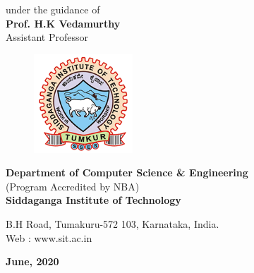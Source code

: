 \begin{titlingpage}
{\normalsize under the guidance of}\\
\Large{\textbf{Prof. H.K Vedamurthy}}\\
Assistant Professor\\
\vfill
\begin{figure}[h]
    \centering
    \includegraphics[height=3.7cm]{images/sit.png}
\end{figure}

\textbf{Department of Computer Science \& Engineering}\\
{\normalsize (Program Accredited by NBA)} \\
\textbf{Siddaganga Institute of Technology}\\

\begin{normalsize}
B.H Road, Tumakuru-572 103, Karnataka, India.\\
Web : www.sit.ac.in \\
\end{normalsize}

\textbf{June, 2020}
\end{titlingpage}
